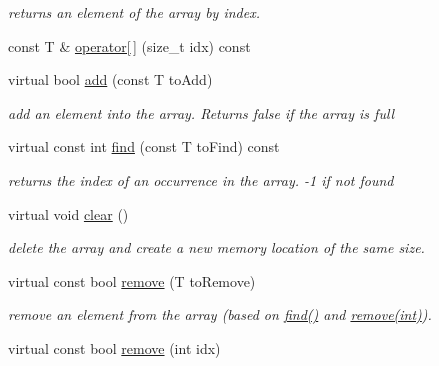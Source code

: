 \begin{DoxyCompactItemize}
\begin{DoxyCompactList}\small\item\em returns an element of the array by index. \end{DoxyCompactList}\item 
const T \& \hyperlink{classparray_1_1PointerArray_aa009614c6819fe08b7eef78be4394dbc}{operator\mbox{[}$\,$\mbox{]}} (size\-\_\-t idx) const 
\item 
\hypertarget{classparray_1_1PointerArray_ae080aeced3af072006e4a609fdadb838}{virtual bool \hyperlink{classparray_1_1PointerArray_ae080aeced3af072006e4a609fdadb838}{add} (const T to\-Add)}\label{classparray_1_1PointerArray_ae080aeced3af072006e4a609fdadb838}

\begin{DoxyCompactList}\small\item\em add an element into the array. Returns false if the array is full \end{DoxyCompactList}\item 
\hypertarget{classparray_1_1PointerArray_a436b6664985dbe49c1a70c2ed79573b3}{virtual const int \hyperlink{classparray_1_1PointerArray_a436b6664985dbe49c1a70c2ed79573b3}{find} (const T to\-Find) const }\label{classparray_1_1PointerArray_a436b6664985dbe49c1a70c2ed79573b3}

\begin{DoxyCompactList}\small\item\em returns the index of an occurrence in the array. -\/1 if not found \end{DoxyCompactList}\item 
\hypertarget{classparray_1_1PointerArray_a2c61803a24765673a1f59ba194566946}{virtual void \hyperlink{classparray_1_1PointerArray_a2c61803a24765673a1f59ba194566946}{clear} ()}\label{classparray_1_1PointerArray_a2c61803a24765673a1f59ba194566946}

\begin{DoxyCompactList}\small\item\em delete the array and create a new memory location of the same size. \end{DoxyCompactList}\item 
\hypertarget{classparray_1_1PointerArray_a13ae3b9b2118416351cc63bd456ecf73}{virtual const bool \hyperlink{classparray_1_1PointerArray_a13ae3b9b2118416351cc63bd456ecf73}{remove} (T to\-Remove)}\label{classparray_1_1PointerArray_a13ae3b9b2118416351cc63bd456ecf73}

\begin{DoxyCompactList}\small\item\em remove an element from the array (based on \hyperlink{classparray_1_1PointerArray_a436b6664985dbe49c1a70c2ed79573b3}{find()} and \hyperlink{classparray_1_1PointerArray_a803f8433e144a60f93e61afc7028d423}{remove(int)}). \end{DoxyCompactList}\item 
\hypertarget{classparray_1_1PointerArray_a803f8433e144a60f93e61afc7028d423}{virtual const bool \hyperlink{classparray_1_1PointerArray_a803f8433e144a60f93e61afc7028d423}{remove} (int idx)}\label{classparray_1_1PointerArray_a803f8433e144a60f93e61afc7028d423}


\end{DoxyCompactItemize}

